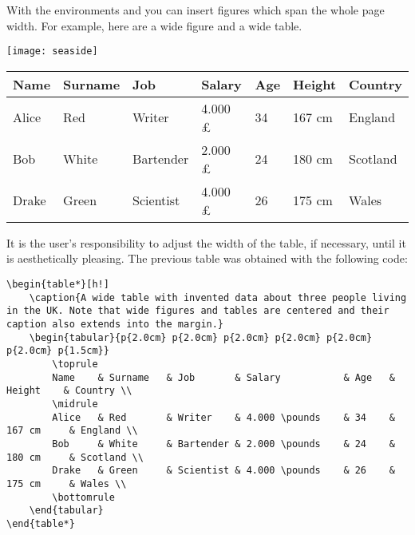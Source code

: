 With the environments  and  you 
can insert figures which span the whole page width. For example, here 
are a wide figure and a wide table.

\begin{figure*}[h!]
    \texttt{[image: seaside]}
    \caption[A wide seaside]{A wide seaside, and a wide caption.
        Credits: By Bushra Feroz, CC BY-SA 4.0, \url{https://commons.wikimedia.org/w/index.php?curid=68724647}}
\end{figure*}

\begin{table*}[h!]
    \caption{A wide table with invented data about three people living in the UK. Note that wide figures and tables are centered and their caption also extends into the margin.}
    \begin{tabular}{p{2.0cm} p{2.0cm} p{2.0cm} p{2.0cm} p{2.0cm} p{2.0cm} p{1.5cm}}
        \toprule
        Name    & Surname   & Job       & Salary           & Age   & Height    & Country \\
        \midrule
        Alice   & Red       & Writer    & 4.000 \pounds    & 34    & 167 cm     & England \\
        Bob     & White     & Bartender & 2.000 \pounds    & 24    & 180 cm     & Scotland \\
        Drake   & Green     & Scientist & 4.000 \pounds    & 26    & 175 cm     & Wales \\
        \bottomrule
    \end{tabular}
\end{table*}

It is the user's responsibility to adjust the width of the table, if 
necessary, until it is aesthetically pleasing. The previous table was 
obtained with the following code:

\begin{lstlisting}[caption=How to typeset a wide table]
\begin{table*}[h!]
    \caption{A wide table with invented data about three people living in the UK. Note that wide figures and tables are centered and their caption also extends into the margin.}
    \begin{tabular}{p{2.0cm} p{2.0cm} p{2.0cm} p{2.0cm} p{2.0cm} p{2.0cm} p{1.5cm}}
        \toprule
        Name    & Surname   & Job       & Salary           & Age   & Height    & Country \\
        \midrule
        Alice   & Red       & Writer    & 4.000 \pounds    & 34    & 167 cm     & England \\
        Bob     & White     & Bartender & 2.000 \pounds    & 24    & 180 cm     & Scotland \\
        Drake   & Green     & Scientist & 4.000 \pounds    & 26    & 175 cm     & Wales \\
        \bottomrule
    \end{tabular}
\end{table*}
\end{lstlisting}

